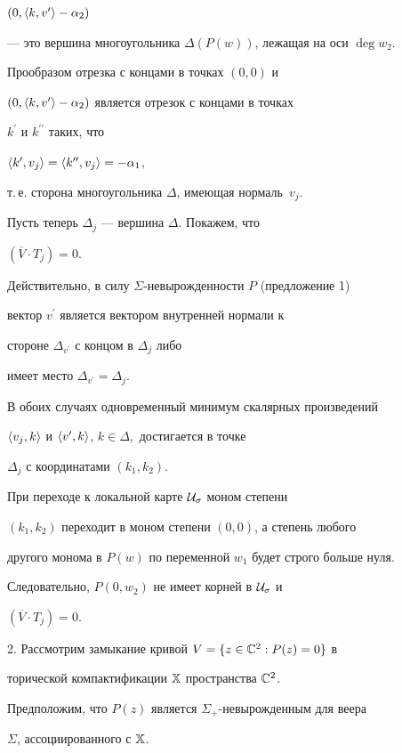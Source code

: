 \begin{pf}
\mbox{$(0,\langle k,v^{\prime}\rangle-\alpha_2)$}


--- это вершина многоугольника $\Delta(P(w))$, лежащая на оси $\deg w_2$.


Прообразом отрезка с концами в точках $(0,0)$ и


$(0, \langle k,v^{\prime}\rangle-\alpha_2)$ является отрезок с концами в точках


$k^{\prime}$ и $k^{\prime\prime}$ таких, что


$\langle k^{\prime},v_j\rangle=\langle k^{\prime\prime},v_j\rangle=-\alpha_1$,


т.\,е. сторона многоугольника $\Delta$, имеющая нормаль~$v_j$.





Пусть теперь $\Delta_j$ --- вершина $\Delta$. Покажем, что


$(\overline V\cdot T_{j})=0$.


Действительно, в силу $\Sigma$-невырожденности $P$ (предложение 1)


вектор $v^{\prime}$ является вектором внутренней нормали к


стороне $\Delta_{v^{\prime}}$ с концом в $\Delta_j$ либо


имеет место $\Delta_{v^{\prime}}=\Delta_j$.


В обоих случаях одновременный минимум скалярных произведений


$\langle v_j,k\rangle$ и $\langle v^{\prime},k\rangle$, $k\in\Delta,$ достигается в точке


$\Delta_j$ с координатами $(k_1,k_2)$.


При переходе к локальной карте $\cal U_{\sigma}$ моном степени


$(k_1,k_2)$ переходит в моном степени $(0,0)$, а степень любого


другого монома в $P(w)$ по переменной $w_1$ будет строго больше нуля.


Следовательно, $P(0,w_2)$ не имеет корней в $\cal U_{\sigma}$ и


$(\overline V\cdot T_{j})=0$.





2. Рассмотрим замыкание кривой $V=\{z\in\Bbb C^2: P(z)=0\}$ в


торической компактификации $\Bbb X$ пространства $\Bbb C^2$.


Предположим, что $P(z)$ является $\Sigma_+$-невырожденным для веера


$\Sigma$, ассоциированного с $\Bbb X$.



\end{pf}
